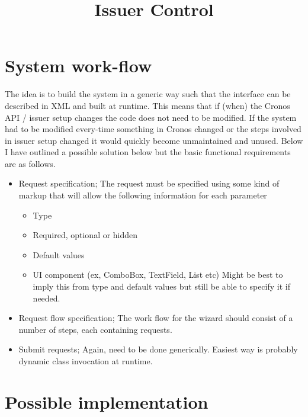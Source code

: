 \documentclass[a4paper,12pt, titlepage]{article}
\title{Issuer Control}
\begin{document}
\maketitle

\section{System work-flow}
The idea is to build the system in a generic way such that the interface can be described in XML and built at runtime. This means that if (when) the Cronos API / issuer setup changes the code does not need to be modified. If the system had to be modified every-time something in Cronos changed or the steps involved in issuer setup changed it would quickly become unmaintained and unused. Below I have outlined a possible solution below but the basic functional requirements are as follows.
\begin{itemize}
\item Request specification; The request must be specified using some kind of markup that will allow the following information for each parameter \label{section:required metadata}
	\begin{itemize}
	\item Type
	\item Required, optional or hidden
	\item Default values
	\item UI component (ex, ComboBox, TextField, List etc) Might be best to imply this from type and default values but still be able to specify it if needed.
	\end{itemize}
\item Request flow specification; The work flow for the wizard should consist of a number of steps, each containing requests.
\item Submit requests; Again, need to be done generically. Easiest way is probably dynamic class invocation at runtime.
\end{itemize}
\section{Possible implementation}
\end{document}
